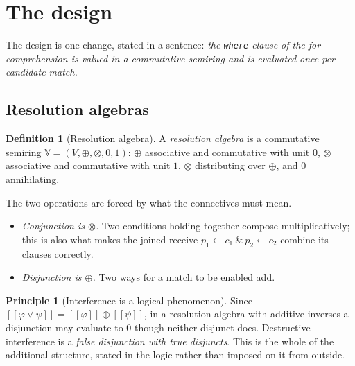 \documentclass[11pt,a4paper]{article}
\theoremstyle{plain}
\theoremstyle{definition}
\newtheorem{definition}[theorem]{Definition}
\newtheorem{principle}[theorem]{Principle}
\theoremstyle{remark}
\newcommand{\sem}[1]{[\![#1]\!]}
\newcommand{\V}{\mathbb{V}}
\newcommand{\tensorv}{\otimes}
\newcommand{\sumv}{\oplus}
\begin{document}
\section{The design}\label{sec:design}

The design is one change, stated in a sentence: \emph{the \texttt{where} clause
of the for-comprehension is valued in a commutative semiring and is evaluated
once per candidate match.}

\subsection{Resolution algebras}

\begin{definition}[Resolution algebra]\label{def:algebra}
A \emph{resolution algebra} is a commutative semiring
$\V = (V, \sumv, \tensorv, 0, 1)$: $\sumv$ associative and commutative with unit
$0$, $\tensorv$ associative and commutative with unit $1$, $\tensorv$
distributing over $\sumv$, and $0$ annihilating.
\end{definition}

The two operations are forced by what the connectives must mean.

\begin{itemize}[leftmargin=1.4em,itemsep=2pt]
\item \emph{Conjunction is $\tensorv$.} Two conditions holding together compose
multiplicatively; this is also what makes the joined receive
$p_1 \leftarrow c_1\ \&\ p_2 \leftarrow c_2$ combine its clauses correctly.
\item \emph{Disjunction is $\sumv$.} Two ways for a match to be enabled add.
\end{itemize}

\begin{principle}[Interference is a logical phenomenon]\label{prin:or}
Since $\sem{\varphi \vee \psi} = \sem{\varphi} \sumv \sem{\psi}$, in a resolution
algebra with additive inverses a disjunction may evaluate to $0$ though neither
disjunct does. Destructive interference is a \emph{false disjunction with true
disjuncts}. This is the whole of the additional structure, stated in the logic
rather than imposed on it from outside.
\end{principle}
\end{document}
